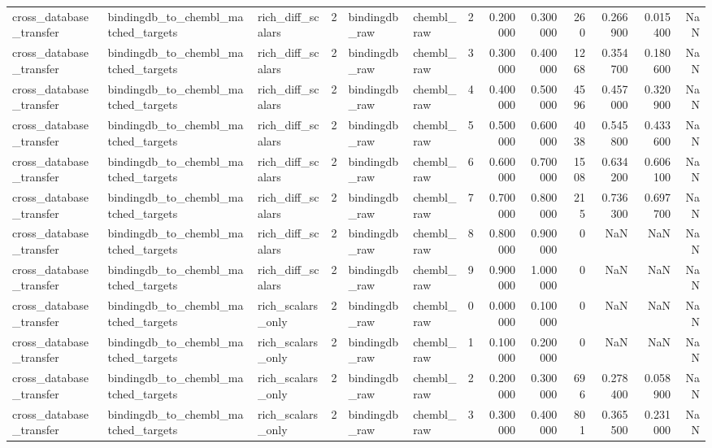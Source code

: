 \begin{longtable}{lllrllrrrrrrr}
cross\_database\_transfer & bindingdb\_to\_chembl\_matched\_targets & rich\_diff\_scalars & 2 & bindingdb\_raw & chembl\_raw & 2 & 0.200000 & 0.300000 & 260 & 0.266900 & 0.015400 & NaN \\
cross\_database\_transfer & bindingdb\_to\_chembl\_matched\_targets & rich\_diff\_scalars & 2 & bindingdb\_raw & chembl\_raw & 3 & 0.300000 & 0.400000 & 1268 & 0.354700 & 0.180600 & NaN \\
cross\_database\_transfer & bindingdb\_to\_chembl\_matched\_targets & rich\_diff\_scalars & 2 & bindingdb\_raw & chembl\_raw & 4 & 0.400000 & 0.500000 & 4596 & 0.457000 & 0.320900 & NaN \\
cross\_database\_transfer & bindingdb\_to\_chembl\_matched\_targets & rich\_diff\_scalars & 2 & bindingdb\_raw & chembl\_raw & 5 & 0.500000 & 0.600000 & 4038 & 0.545800 & 0.433600 & NaN \\
cross\_database\_transfer & bindingdb\_to\_chembl\_matched\_targets & rich\_diff\_scalars & 2 & bindingdb\_raw & chembl\_raw & 6 & 0.600000 & 0.700000 & 1508 & 0.634200 & 0.606100 & NaN \\
cross\_database\_transfer & bindingdb\_to\_chembl\_matched\_targets & rich\_diff\_scalars & 2 & bindingdb\_raw & chembl\_raw & 7 & 0.700000 & 0.800000 & 215 & 0.736300 & 0.697700 & NaN \\
cross\_database\_transfer & bindingdb\_to\_chembl\_matched\_targets & rich\_diff\_scalars & 2 & bindingdb\_raw & chembl\_raw & 8 & 0.800000 & 0.900000 & 0 & NaN & NaN & NaN \\
cross\_database\_transfer & bindingdb\_to\_chembl\_matched\_targets & rich\_diff\_scalars & 2 & bindingdb\_raw & chembl\_raw & 9 & 0.900000 & 1.000000 & 0 & NaN & NaN & NaN \\
cross\_database\_transfer & bindingdb\_to\_chembl\_matched\_targets & rich\_scalars\_only & 2 & bindingdb\_raw & chembl\_raw & 0 & 0.000000 & 0.100000 & 0 & NaN & NaN & NaN \\
cross\_database\_transfer & bindingdb\_to\_chembl\_matched\_targets & rich\_scalars\_only & 2 & bindingdb\_raw & chembl\_raw & 1 & 0.100000 & 0.200000 & 0 & NaN & NaN & NaN \\
cross\_database\_transfer & bindingdb\_to\_chembl\_matched\_targets & rich\_scalars\_only & 2 & bindingdb\_raw & chembl\_raw & 2 & 0.200000 & 0.300000 & 696 & 0.278400 & 0.058900 & NaN \\
cross\_database\_transfer & bindingdb\_to\_chembl\_matched\_targets & rich\_scalars\_only & 2 & bindingdb\_raw & chembl\_raw & 3 & 0.300000 & 0.400000 & 801 & 0.365500 & 0.231000 & NaN \\

\end{longtable}
